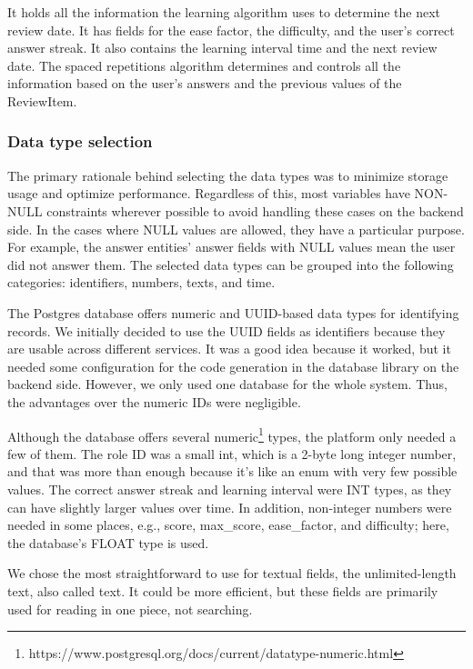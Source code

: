 It holds all the information the learning algorithm uses to determine the next review date. It has fields for the ease factor, the difficulty, and the user's correct answer streak. It also contains the learning interval time and the next review date. The spaced repetitions algorithm determines and controls all the information based on the user's answers and the previous values of the ReviewItem.

\subsubsection{Data type selection}

The primary rationale behind selecting the data types was to minimize storage usage and optimize performance. Regardless of this, most variables have NON-NULL constraints wherever possible to avoid handling these cases on the backend side. In the cases where NULL values are allowed, they have a particular purpose. For example, the answer entities' answer fields with NULL values mean the user did not answer them. The selected data types can be grouped into the following categories: identifiers, numbers, texts, and time.

The Postgres database offers numeric and UUID-based data types for identifying records. We initially decided to use the UUID fields as identifiers because they are usable across different services. It was a good idea because it worked, but it needed some configuration for the code generation in the database library on the backend side. However, we only used one database for the whole system. Thus, the advantages over the numeric IDs were negligible.

Although the database offers several numeric\footnote{https://www.postgresql.org/docs/current/datatype-numeric.html} types, the platform only needed a few of them. The role ID was a small int, which is a 2-byte long integer number, and that was more than enough because it's like an enum with very few possible values. The correct answer streak and learning interval were INT types, as they can have slightly larger values over time. In addition, non-integer numbers were needed in some places, e.g., score, max\_score, ease\_factor, and difficulty; here, the database's FLOAT type is used.

We chose the most straightforward to use for textual fields, the unlimited-length text, also called text. It could be more efficient, but these fields are primarily used for reading in one piece, not searching.

